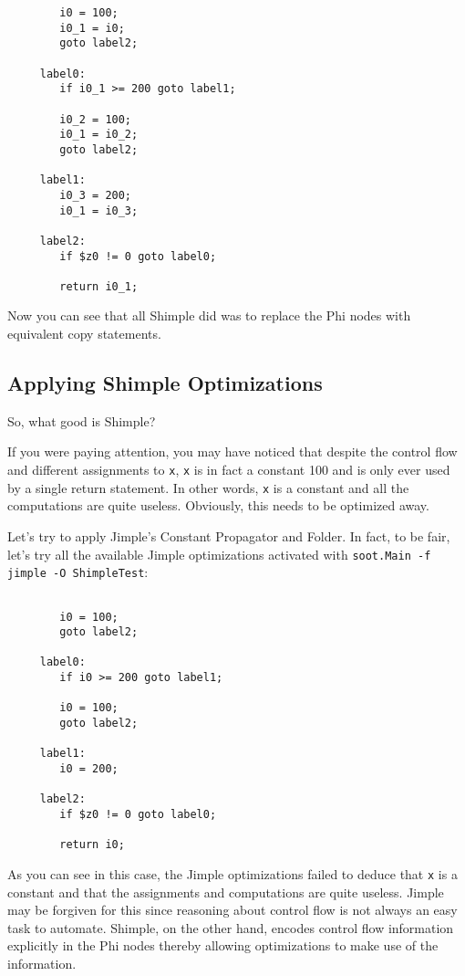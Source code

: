 \documentclass[10pt,letterpaper,oneside,onecolumn]{article}
\begin{document}
\begin{verbatim}
        i0 = 100;
        i0_1 = i0;
        goto label2;

     label0:
        if i0_1 >= 200 goto label1;

        i0_2 = 100;
        i0_1 = i0_2;
        goto label2;

     label1:
        i0_3 = 200;
        i0_1 = i0_3;

     label2:
        if $z0 != 0 goto label0;

        return i0_1;
\end{verbatim}

Now you can see that all Shimple did was to replace the Phi nodes
with equivalent copy statements.

\subsection{Applying Shimple Optimizations}

So, what good is Shimple?  

If you were paying attention, you may have noticed that despite the
control flow and different assignments to {\tt x}, {\tt x} is in fact
a constant 100 and is only ever used by a single return statement.  In
other words, {\tt x} is a constant and all the computations are quite
useless.  Obviously, this needs to be optimized away.

Let's try to apply Jimple's Constant Propagator and Folder.  In fact,
to be fair, let's try all the available  Jimple optimizations activated
with {\tt soot.Main -f jimple -O ShimpleTest}:

\begin{verbatim}

        i0 = 100;
        goto label2;

     label0:
        if i0 >= 200 goto label1;

        i0 = 100;
        goto label2;

     label1:
        i0 = 200;

     label2:
        if $z0 != 0 goto label0;

        return i0;
\end{verbatim}

As you can see in this case, the Jimple optimizations failed to deduce
that {\tt x} is a constant and that the assignments and computations
are quite useless.  Jimple may be forgiven for this since reasoning
about control flow is not always an easy task to automate.  Shimple,
on the other hand, encodes control flow information explicitly in the
Phi nodes thereby allowing optimizations to make use of the
information.
\end{document}
